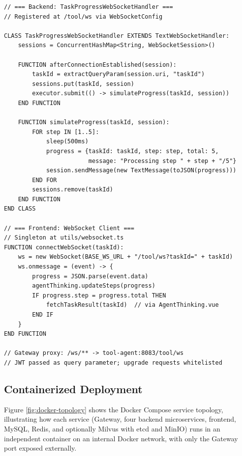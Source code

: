 \vspace{3mm}

\begin{table}[H]
\small\singlespacing
\centering
\caption{Pseudocode --- TaskProgressWebSocketHandler Real-Time Progress Streaming}
\label{tab:pseudocode-websocket}
\vspace{2mm}

\begin{lstlisting}
// === Backend: TaskProgressWebSocketHandler ===
// Registered at /tool/ws via WebSocketConfig

CLASS TaskProgressWebSocketHandler EXTENDS TextWebSocketHandler:
    sessions = ConcurrentHashMap<String, WebSocketSession>()

    FUNCTION afterConnectionEstablished(session):
        taskId = extractQueryParam(session.uri, "taskId")
        sessions.put(taskId, session)
        executor.submit(() -> simulateProgress(taskId, session))
    END FUNCTION

    FUNCTION simulateProgress(taskId, session):
        FOR step IN [1..5]:
            sleep(500ms)
            progress = {taskId: taskId, step: step, total: 5,
                        message: "Processing step " + step + "/5"}
            session.sendMessage(new TextMessage(toJSON(progress)))
        END FOR
        sessions.remove(taskId)
    END FUNCTION
END CLASS

// === Frontend: WebSocket Client ===
// Singleton at utils/websocket.ts
FUNCTION connectWebSocket(taskId):
    ws = new WebSocket(BASE_WS_URL + "/tool/ws?taskId=" + taskId)
    ws.onmessage = (event) -> {
        progress = JSON.parse(event.data)
        agentThinking.updateSteps(progress)
        IF progress.step = progress.total THEN
            fetchTaskResult(taskId)  // via AgentThinking.vue
        END IF
    }
END FUNCTION

// Gateway proxy: /ws/** -> tool-agent:8083/tool/ws
// JWT passed as query parameter; upgrade requests whitelisted
\end{lstlisting}
\end{table}


\subsection{Containerized Deployment}

Figure \ref{fig:docker-topology} shows the Docker Compose service topology, illustrating how each service (Gateway, four backend microservices, frontend, MySQL, Redis, and optionally Milvus with etcd and MinIO) runs in an independent container on an internal Docker network, with only the Gateway port exposed externally.

